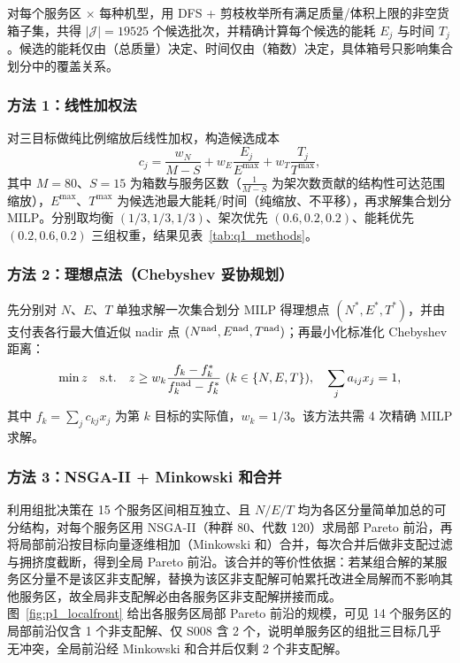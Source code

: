 对每个服务区 $\times$ 每种机型，用 DFS + 剪枝枚举所有满足质量/体积上限的非空货箱子集，共得 $|\mathcal{J}|=19525$ 个候选批次，并精确计算每个候选的能耗 $E_j$ 与时间 $T_j$。候选的能耗仅由（总质量）决定、时间仅由（箱数）决定，具体箱号只影响集合划分中的覆盖关系。

\subsubsection{方法 1：线性加权法}

对三目标做纯比例缩放后线性加权，构造候选成本
\begin{equation}
c_j = \frac{w_N}{M-S} + w_E\frac{E_j}{E^{\max}} + w_T\frac{T_j}{T^{\max}},
\end{equation}
其中 $M=80$、$S=15$ 为箱数与服务区数（$\tfrac{1}{M-S}$ 为架次数贡献的结构性可达范围缩放），$E^{\max}$、$T^{\max}$ 为候选池最大能耗/时间（纯缩放、不平移），再求解集合划分 MILP。分别取均衡 $(1/3,1/3,1/3)$、架次优先 $(0.6,0.2,0.2)$、能耗优先 $(0.2,0.6,0.2)$ 三组权重，结果见表~\ref{tab:q1_methods}。

\subsubsection{方法 2：理想点法（Chebyshev 妥协规划）}

先分别对 $N$、$E$、$T$ 单独求解一次集合划分 MILP 得理想点 $(N^*,E^*,T^*)$，并由支付表各行最大值近似 nadir 点 $(N^{\rm nad},E^{\rm nad},T^{\rm nad})$；再最小化标准化 Chebyshev 距离：
\begin{equation}
\min z \quad \text{s.t.} \quad z \ge w_k\frac{f_k-f_k^*}{f_k^{\rm nad}-f_k^*}\ (k\in\{N,E,T\}),\quad \sum_j a_{ij}x_j=1,
\end{equation}
其中 $f_k=\sum_j c_{kj}x_j$ 为第 $k$ 目标的实际值，$w_k=1/3$。该方法共需 4 次精确 MILP 求解。

\subsubsection{方法 3：NSGA-II + Minkowski 和合并}

利用组批决策在 15 个服务区间相互独立、且 $N/E/T$ 均为各区分量简单加总的可分结构，对每个服务区用 NSGA-II（种群 80、代数 120）求局部 Pareto 前沿，再将局部前沿按目标向量逐维相加（Minkowski 和）合并，每次合并后做非支配过滤与拥挤度截断，得到全局 Pareto 前沿。该合并的等价性依据：若某组合解的某服务区分量不是该区非支配解，替换为该区非支配解可帕累托改进全局解而不影响其他服务区，故全局非支配解必由各服务区非支配解拼接而成\cite{ref_nsga2}。图~\ref{fig:p1_localfront} 给出各服务区局部 Pareto 前沿的规模，可见 14 个服务区的局部前沿仅含 1 个非支配解、仅 S008 含 2 个，说明单服务区的组批三目标几乎无冲突，全局前沿经 Minkowski 和合并后仅剩 2 个非支配解。

